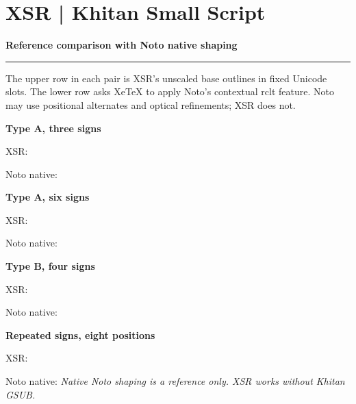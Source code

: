 \documentclass[12pt]{article}
\newcommand\PageTitle[1]{\section*{XSR \xsrPackageVersion\space | Khitan Small Script}\textbf{#1}\par\smallskip\hrule\medskip}
\begin{document}
\newpage
\PageTitle{Reference comparison with Noto native shaping}
The upper row in each pair is XSR's unscaled base outlines in fixed Unicode
slots. The lower row asks XeTeX to apply Noto's contextual rclt feature.
Noto may use positional alternates and optical refinements; XSR does not.
\par\bigskip
\textbf{Type A, three signs}\par
XSR:\quad {}\par
Noto native:\par\bigskip
\textbf{Type A, six signs}\par
XSR:\quad {}\par
Noto native:\par\bigskip
\textbf{Type B, four signs}\par
XSR:\quad {}\par
Noto native:\par\bigskip
\textbf{Repeated signs, eight positions}\par
XSR:\quad {}\par
Noto native:
\vfill
\textit{Native Noto shaping is a reference only. XSR works without Khitan GSUB.}

\end{document}
